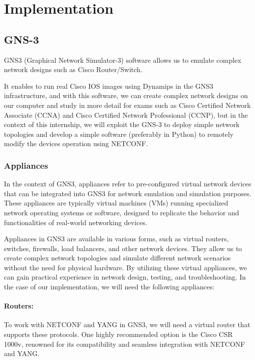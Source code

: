 \chapter{Implementation}

\section{GNS-3}

GNS3 (Graphical Network Simulator-3) software allows us to emulate complex network designs such as Cisco Router/Switch.

It enables to run real Cisco IOS images using Dynamips in the GNS3 infrastructure, and with this software, we can create complex network designs on our computer and study in more detail for exams such as Cisco Certified Network Associate (CCNA) and Cisco Certified Network Professional (CCNP), but in the context of this internship, we will exploit the GNS-3 to deploy simple network topologies and develop a simple software (preferably in Python) to remotely modify the devices operation using NETCONF.


\subsection{Appliances}
In the context of GNS3, appliances refer to pre-configured virtual network devices that can be integrated into GNS3 for network emulation and simulation purposes. These appliances are typically virtual machines (VMs) running specialized network operating systems or software, designed to replicate the behavior and functionalities of real-world networking devices.

Appliances in GNS3 are available in various forms, such as virtual routers, switches, firewalls, load balancers, and other network devices. They allow us to create complex network topologies and simulate different network scenarios without the need for physical hardware. By utilizing these virtual appliances, we can gain practical experience in network design, testing, and troubleshooting. In the case of our implementation, we will need the following appliances:


\subsubsection{Routers:}

To work with NETCONF and YANG in GNS3, we will need a virtual router that supports these protocols. One highly recommended option is the Cisco CSR 1000v, renowned for its compatibility and seamless integration with NETCONF and YANG.

